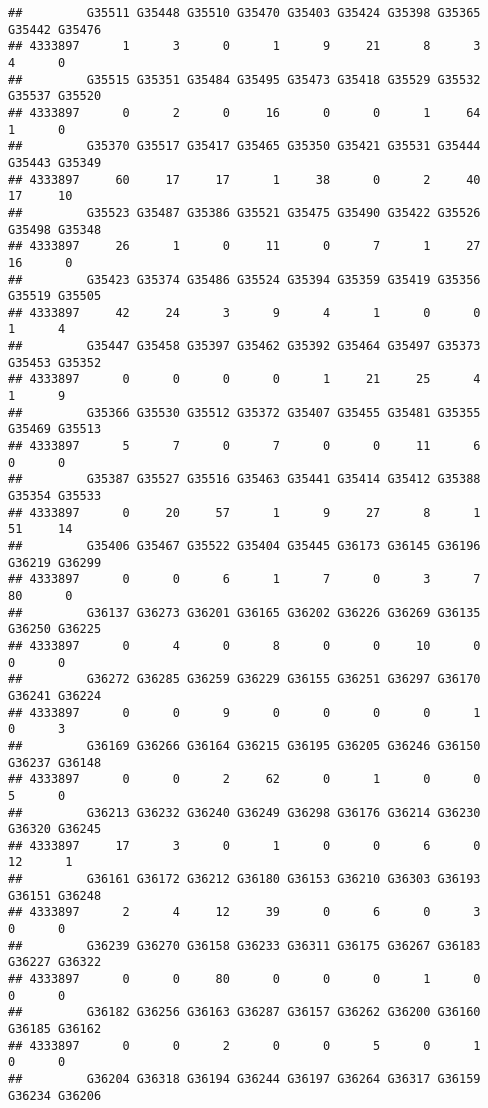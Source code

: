 \documentclass[
]{article}
\begin{document}
\begin{verbatim}
##         G35511 G35448 G35510 G35470 G35403 G35424 G35398 G35365 G35442 G35476
## 4333897      1      3      0      1      9     21      8      3      4      0
##         G35515 G35351 G35484 G35495 G35473 G35418 G35529 G35532 G35537 G35520
## 4333897      0      2      0     16      0      0      1     64      1      0
##         G35370 G35517 G35417 G35465 G35350 G35421 G35531 G35444 G35443 G35349
## 4333897     60     17     17      1     38      0      2     40     17     10
##         G35523 G35487 G35386 G35521 G35475 G35490 G35422 G35526 G35498 G35348
## 4333897     26      1      0     11      0      7      1     27     16      0
##         G35423 G35374 G35486 G35524 G35394 G35359 G35419 G35356 G35519 G35505
## 4333897     42     24      3      9      4      1      0      0      1      4
##         G35447 G35458 G35397 G35462 G35392 G35464 G35497 G35373 G35453 G35352
## 4333897      0      0      0      0      1     21     25      4      1      9
##         G35366 G35530 G35512 G35372 G35407 G35455 G35481 G35355 G35469 G35513
## 4333897      5      7      0      7      0      0     11      6      0      0
##         G35387 G35527 G35516 G35463 G35441 G35414 G35412 G35388 G35354 G35533
## 4333897      0     20     57      1      9     27      8      1     51     14
##         G35406 G35467 G35522 G35404 G35445 G36173 G36145 G36196 G36219 G36299
## 4333897      0      0      6      1      7      0      3      7     80      0
##         G36137 G36273 G36201 G36165 G36202 G36226 G36269 G36135 G36250 G36225
## 4333897      0      4      0      8      0      0     10      0      0      0
##         G36272 G36285 G36259 G36229 G36155 G36251 G36297 G36170 G36241 G36224
## 4333897      0      0      9      0      0      0      0      1      0      3
##         G36169 G36266 G36164 G36215 G36195 G36205 G36246 G36150 G36237 G36148
## 4333897      0      0      2     62      0      1      0      0      5      0
##         G36213 G36232 G36240 G36249 G36298 G36176 G36214 G36230 G36320 G36245
## 4333897     17      3      0      1      0      0      6      0     12      1
##         G36161 G36172 G36212 G36180 G36153 G36210 G36303 G36193 G36151 G36248
## 4333897      2      4     12     39      0      6      0      3      0      0
##         G36239 G36270 G36158 G36233 G36311 G36175 G36267 G36183 G36227 G36322
## 4333897      0      0     80      0      0      0      1      0      0      0
##         G36182 G36256 G36163 G36287 G36157 G36262 G36200 G36160 G36185 G36162
## 4333897      0      0      2      0      0      5      0      1      0      0
##         G36204 G36318 G36194 G36244 G36197 G36264 G36317 G36159 G36234 G36206

\end{verbatim}
\end{document}
